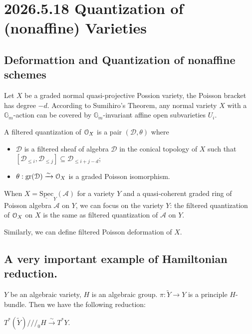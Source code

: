 \documentclass[12pt]{amsart}
\numberwithin{equation}{section}
\newcommand{\CA}{{\mathcal {A}}} \newcommand{\CB}{{\mathcal {B}}} \newcommand{\CC}{{\mathcal {C}}}
\newcommand{\gr}{{\mathrm{gr}}}   \newcommand{\Sym}{{\mathrm{Sym}}}
\newcommand{\Spec}{\mathrm{Spec}}
\renewcommand{\tilde}{\widetilde}
\begin{document}
\section{2026.5.18 Quantization of (nonaffine) Varieties}


\subsection{Deformattion and Quantization of nonaffine schemes}

Let $X$ be a graded normal quasi-projective Possion variety, the Poisson bracket has degree $-d$. According to Sumihiro's Theorem, any normal variety $X$ with a $\mathbb{G}_m$-action can be covered by $\mathbb{G}_m$-invariant affine open subvarieties $U_i$.

\begin{defn}
  A filtered quantization of ${\mathcal {O}}_X$ is a pair $(\mathcal{D},\theta)$ where
  \begin{itemize}
    \item $\mathcal{D}$ is a filtered sheaf of algebra $\mathcal{D}$ in the conical topology of $X$ such that $[\mathcal{D}_{\leq i}, \mathcal{D}_{\leq j}] \subseteq \mathcal{D}_{\leq i+j - d}$;
    \item $\theta: \gr(\mathcal{D}) \xrightarrow{\sim} \CO_X$ is a graded Poisson isomorphism.
  \end{itemize}
\end{defn}


\begin{rk}
  When $X = \underline{\Spec}_{Y}(\CA)$ for a variety $Y$ and a quasi-coherent graded ring of Poisson algebra $\CA$ on $Y$, we can focus on the variety $Y$: the filtered quantization of ${\mathcal {O}}_X$ on $X$ is the same as filtered quantization of $\CA$ on $Y$.
\end{rk}

Similarly, we can define filtered Poisson deformation of $X$.

\subsection{A very important example of Hamiltonian reduction.}



$Y$ be an algebraic variety, $H$ is an algebraic group. $\pi: \tilde{Y} \to Y$ is a principle $H$-bundle. Then we have the following reduction:

\begin{thm}
  $T^*(\tilde{Y}) \mathbin{/\!/\!/}_0 H \xrightarrow{\sim} T^*Y$.
\end{thm}
\end{document}
